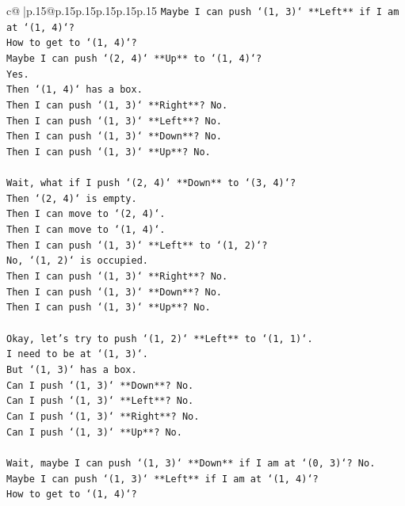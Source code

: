 \documentclass{article}
\begin{document}
{\begin{supertabular}{c@{$\;$}|p{.15\linewidth}@{}p{.15\linewidth}p{.15\linewidth}p{.15\linewidth}p{.15\linewidth}p{.15\linewidth}}
{{{\texttt{Maybe I can push `(1, 3)` **Left** if I am at `(1, 4)`?} \\
\texttt{How to get to `(1, 4)`?} \\
\texttt{Maybe I can push `(2, 4)` **Up** to `(1, 4)`?} \\
\texttt{Yes.} \\
\texttt{Then `(1, 4)` has a box.} \\
\texttt{Then I can push `(1, 3)` **Right**? No.} \\
\texttt{Then I can push `(1, 3)` **Left**? No.} \\
\texttt{Then I can push `(1, 3)` **Down**? No.} \\
\texttt{Then I can push `(1, 3)` **Up**? No.} \\
\\ 
\texttt{Wait, what if I push `(2, 4)` **Down** to `(3, 4)`?} \\
\texttt{Then `(2, 4)` is empty.} \\
\texttt{Then I can move to `(2, 4)`.} \\
\texttt{Then I can move to `(1, 4)`.} \\
\texttt{Then I can push `(1, 3)` **Left** to `(1, 2)`?} \\
\texttt{No, `(1, 2)` is occupied.} \\
\texttt{Then I can push `(1, 3)` **Right**? No.} \\
\texttt{Then I can push `(1, 3)` **Down**? No.} \\
\texttt{Then I can push `(1, 3)` **Up**? No.} \\
\\ 
\texttt{Okay, let's try to push `(1, 2)` **Left** to `(1, 1)`.} \\
\texttt{I need to be at `(1, 3)`.} \\
\texttt{But `(1, 3)` has a box.} \\
\texttt{Can I push `(1, 3)` **Down**? No.} \\
\texttt{Can I push `(1, 3)` **Left**? No.} \\
\texttt{Can I push `(1, 3)` **Right**? No.} \\
\texttt{Can I push `(1, 3)` **Up**? No.} \\
\\ 
\texttt{Wait, maybe I can push `(1, 3)` **Down** if I am at `(0, 3)`? No.} \\
\texttt{Maybe I can push `(1, 3)` **Left** if I am at `(1, 4)`?} \\
\texttt{How to get to `(1, 4)`?} \\
}}}
\end{supertabular}}
\end{document}
